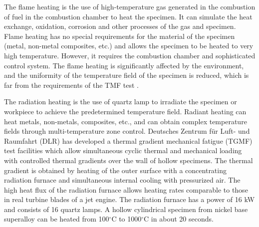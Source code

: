 \documentclass[preprint,5p,twocolumn,11pt,sort&compress]{elsarticle}
\begin{document}
The flame heating is the use of high-temperature gas generated in the combustion of fuel in the combustion chamber to heat the specimen. It can simulate the heat exchange, oxidation, corrosion and other processes of the gas and specimen. Flame heating has no special requirements for the material of the specimen (metal, non-metal composites, etc.) and allows the specimen to be heated to very high temperature. However, it requires the combustion chamber and sophisticated control system. The flame heating is significantly affected by the environment, and the uniformity of the temperature field of the specimen is reduced, which is far from the requirements of the TMF test \cite{MAUGET2017225}.

The radiation heating is the use of quartz lamp to irradiate the specimen or workpiece to achieve the predetermined temperature field. Radiant heating can heat metals, non-metals, composites, etc., and can obtain complex temperature fields through multi-temperature zone control.
Deutsches Zentrum f\"{u}r Luft- und Raumfahrt (DLR) \cite{BAUFELD2008219} has developed a thermal gradient mechanical fatigue (TGMF) test facilities which allow simultaneous cyclic thermal and mechanical loading with controlled thermal gradients over the wall of hollow specimens. The thermal gradient is obtained by heating of the outer surface with a concentrating radiation furnace and simultaneous internal cooling with pressurized air. The high heat flux of the radiation furnace allows heating rates comparable to those in real turbine blades of a jet engine. The radiation furnace has a power of 16 kW and consists of 16 quartz lamps. A hollow cylindrical specimen from nickel base superalloy can be heated from 100$^\circ$C to 1000$^\circ$C in about 20 seconds. 
\end{document}
